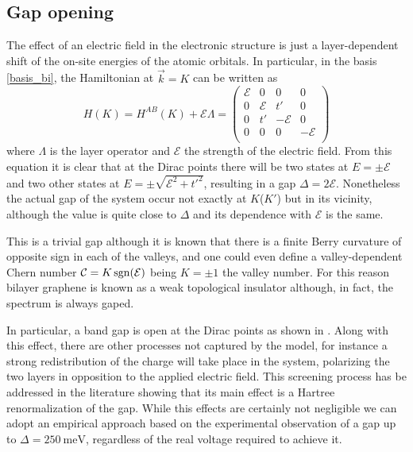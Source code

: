 \subsection{Gap opening}
The effect of an electric field in the electronic structure is just a layer-dependent shift of the on-site energies of the atomic orbitals. In particular, in the basis \eqref{basis_bi}, the Hamiltonian at $\vec{k}=K$ can be written as
\begin{equation}
   H(K) = H^{AB}(K)+\mathcal{E}\Lambda = \left(
   \begin{array}{cc|cc}
     \mathcal{E} & 0 & 0 & 0\\
     0 & \mathcal{E} & t' & 0\\ \hline
     0 & t' & -\mathcal{E} & 0\\
     0 & 0 & 0 & -\mathcal{E}\\
   \end{array}\right)
\label{Helec}
\end{equation}
where $\Lambda$ is the layer operator and $\mathcal{E}$ the strength of the electric field. From this equation it is clear that at the Dirac points there will be two states at $E=\pm\mathcal{E}$ and two other states at $E=\pm\sqrt{\mathcal{E}^2+t'^{2}}$, resulting in a gap $\Delta = 2\mathcal{E}$. Nonetheless the actual gap of the system occur not exactly at $K$($K'$) but in its vicinity, although the value is quite close to $\Delta$ and its dependence with $\mathcal{E}$ is the same.

This is a trivial gap although it is known that there is a finite Berry curvature of opposite sign in each of the valleys, and one could even define a valley-dependent Chern number\cite{Martin2008,San-Jose2009} $\mathcal{C}=K\operatorname{sgn}({\mathcal{E}})$ being $K=\pm1$ the valley number. For this reason bilayer graphene is known as a weak topological insulator although, in fact, the spectrum is always gaped.


In particular, a band gap is open at the Dirac points as shown in . Along with this effect, there are other processes not captured by the model, for instance a strong redistribution of the charge will take place in the system, polarizing the two layers in opposition to the applied electric field. This screening process has be addressed in the literature showing that its main effect is a Hartree renormalization of the gap\cite{McCann2006,Wang2016a}. While this effects are certainly not negligible we can adopt an empirical approach based on the experimental observation\cite{Zhang2009, Taychatanapat2010} of a gap up to $\Delta=\SI{250}{\meV}$, regardless of the real voltage required to achieve it.



